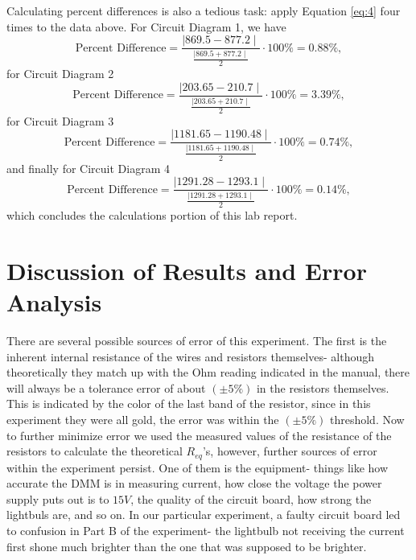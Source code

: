 \documentclass{article}
\theoremstyle{definition}
\begin{document}
Calculating percent differences is also a tedious task: apply Equation \ref{eq:4} four times to the data above.
For Circuit Diagram 1, we have
\begin{equation*}
    \text{Percent Difference} = \frac{\mid \! 869.5-877.2  \mid}{\frac{\mid 869.5+877.2 \mid}{2}} \cdot 100\% = 0.88\%,
\end{equation*}
for Circuit Diagram 2
\begin{equation*}
    \text{Percent Difference} = \frac{\mid \!203.65 - 210.7 \mid}{\frac{\mid 203.65 + 210.7 \mid}{2}} \cdot 100\% = 3.39\%,
\end{equation*}
for Circuit Diagram 3
\begin{equation*}
    \text{Percent Difference} = \frac{\mid \! 1181.65-1190.48  \mid}{\frac{\mid  1181.65+1190.48  \mid}{2}} \cdot 100\% = 0.74\%,
\end{equation*}
and finally for Circuit Diagram 4
\begin{equation*}
    \text{Percent Difference} = \frac{\mid \! 1291.28-1293.1  \mid}{\frac{\mid  1291.28+1293.1  \mid}{2}} \cdot 100\% = 0.14\%,
\end{equation*}
which concludes the calculations portion of this lab report.
\section{Discussion of Results and Error Analysis}
There are several possible sources of error of this experiment. The first is the inherent internal resistance of the wires and 
resistors themselves- although theoretically they match up with the Ohm reading indicated in the manual, there will always be a tolerance error
of about $(\pm 5\%)$ in the resistors themselves. This is indicated by the color of the last band of the resistor, since in this experiment they
were all gold, the error was within the $(\pm 5\%)$ threshold. Now to further minimize error we used the measured values of the resistance of the resistors to calculate 
the theoretical $R_{eq}$'s, however, further sources of error within the experiment persist. One of them is the equipment- things like how accurate
the DMM is in measuring current, how close the voltage the power supply puts out is to $15V$, the quality of the circuit board, how strong the lightbuls are, and so on.
In our particular experiment, a faulty circuit board led to confusion in Part B of the experiment- the lightbulb not receiving the current first shone much brighter than the
one that was supposed to be brighter. 
\end{document}
